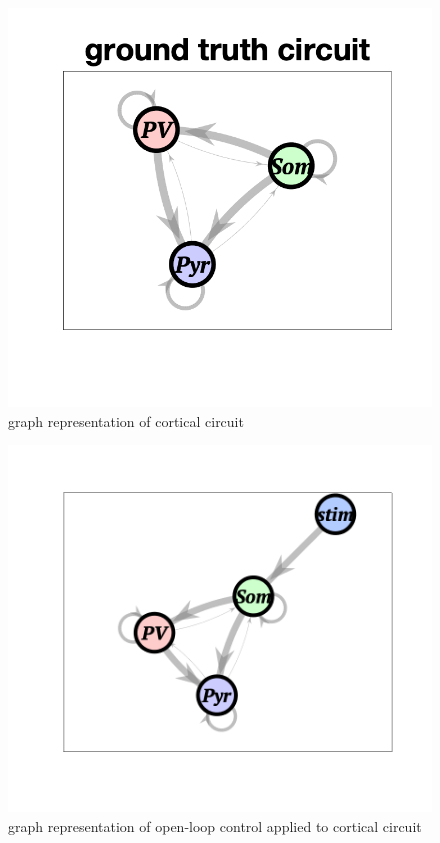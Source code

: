 \begin{figure}[h]
    \centering
    \includegraphics[width=\textwidth/2]{obsv_graph.png}
    \caption{graph representation of cortical circuit}
\end{figure}

\begin{figure}[h]
    \centering
    \includegraphics[width=\textwidth/2]{ol_graph.png}
    \caption{graph representation of open-loop control applied to cortical circuit}
\end{figure}

